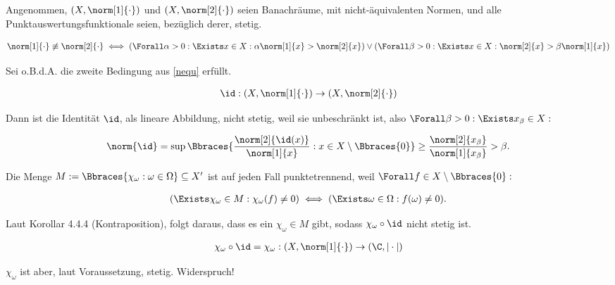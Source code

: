 \begin{solution}

Angenommen, $(X, \norm[1]{\cdot})$ und $(X, \norm[2]{\cdot})$ seien Banachräume, mit nicht-äquivalenten Normen, und alle Punktauswertungsfunktionale seien, bezüglich derer, stetig.

\begin{align}
\label{nequ}
  \norm[1]{\cdot} \not \equiv \norm[2]{\cdot}
  \iff
  (
    \Forall \alpha > 0:
    \Exists x \in X:
    \alpha \norm[1]{x} > \norm[2]{x}
  )
  \lor
  (
    \Forall \beta > 0:
    \Exists x \in X:
    \norm[2]{x} > \beta \norm[1]{x}
  )
\end{align}

Sei o.B.d.A. die zweite Bedingung aus \eqref{nequ} erfüllt.

\begin{align*}
  \id:
  (X, \norm[1]{\cdot})
  \to
  (X, \norm[2]{\cdot})
\end{align*}

Dann ist die Identität $\id$, als lineare Abbildung, nicht stetig, weil sie unbeschränkt ist, also $\Forall \beta > 0: \Exists x_\beta \in X:$

\begin{align*}
  \norm{\id}
  =
  \sup \Bbraces
  {
    \frac{\norm[2]{\id(x)}}{\norm[1]{x}}:
    x \in X \setminus \Bbraces{0}
  }
  \geq
  \frac{\norm[2]{x_\beta}}{\norm[1]{x_\beta}}
  >
  \beta.
\end{align*}

Die Menge $M := \Bbraces{\chi_\omega: \omega \in \Omega} \subseteq X^\prime$ ist auf jeden Fall punktetrennend, weil $\Forall f \in X \setminus \Bbraces{0}:$

\begin{align*}
  (
    \Exists \chi_\omega \in M:
    \chi_\omega(f) \neq 0
  )
  \iff
  (
    \Exists \omega \in \Omega:
    f(\omega) \neq 0
  ).
\end{align*}

Laut Korollar 4.4.4 (Kontraposition), folgt daraus, dass es ein $\chi_\omega \in M$ gibt, sodass $\chi_\omega \circ \id$ nicht stetig ist.

\begin{align*}
  \chi_\omega \circ \id
  =
  \chi_\omega:
  (X, \norm[1]{\cdot}) \to (\C, |\cdot|)
\end{align*}

$\chi_\omega$ ist aber, laut Voraussetzung, stetig. Widerspruch!

\end{solution}
